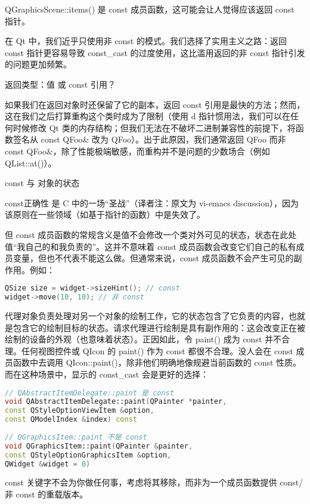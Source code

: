 QGraphicsScene::items() 是 const 成员函数，这可能会让人觉得应该返回 const 指针。

在 Qt 中，我们近乎只使用非 const 的模式。我们选择了实用主义之路：返回 const 指针更容易导致 const\_cast 的过度使用，这比滥用返回的非 const 指针引发的问题更加频繁。

返回类型：值 或 const 引用？

如果我们在返回对象时还保留了它的副本，返回 const 引用是最快的方法；然而，这在我们之后打算重构这个类时成为了限制（使用 d 指针惯用法，我们可以在任何时候修改 Qt 类的内存结构；但我们无法在不破坏二进制兼容性的前提下，将函数签名从 const QFoo\& 改为 QFoo）。出于此原因，我们通常返回 QFoo 而非 const QFoo\&，除了性能极端敏感，而重构并不是问题的少数场合（例如 QList::at()）。

const 与 对象的状态

const正确性 是 C 中的一场“圣战”（译者注：原文为 vi-emacs discussion），因为该原则在一些领域（如基于指针的函数）中是失效了。

但 const 成员函数的常规含义是值不会修改一个类对外可见的状态，状态在此处值“我自己的和我负责的”。这并不意味着 const 成员函数会改变它们自己的私有成员变量，但也不代表不能这么做。但通常来说，const 成员函数不会产生可见的副作用。例如：

\begin{lstlisting}[language=C++]
QSize size = widget->sizeHint(); // const
widget->move(10, 10); // 非 const
\end{lstlisting}

代理对象负责处理对另一个对象的绘制工作，它的状态包含了它负责的内容，也就是包含它的绘制目标的状态。请求代理进行绘制是具有副作用的：这会改变正在被绘制的设备的外观（也意味着状态）。正因如此，令 paint() 成为 const 并不合理。任何视图控件或 QIcon 的 paint() 作为 const 都很不合理。没人会在 const 成员函数中去调用 QIcon::paint()，除非他们明确地像规避当前函数的 const 性质。而在这种场景中，显示的 const\_cast 会是更好的选择：

\begin{lstlisting}[language=C++]
// QAbstractItemDelegate::paint 是 const
void QAbstractItemDelegate::paint(QPainter *painter,
const QStyleOptionViewItem &option,
const QModelIndex &index) const
 
// QGraphicsItem::paint 不是 const
void QGraphicsItem::paint(QPainter &painter, 
const QStyleOptionGraphicsItem &option, 
QWidget &widget = 0)
\end{lstlisting}

const 关键字不会为你做任何事，考虑将其移除，而非为一个成员函数提供 const/非 const 的重载版本。

